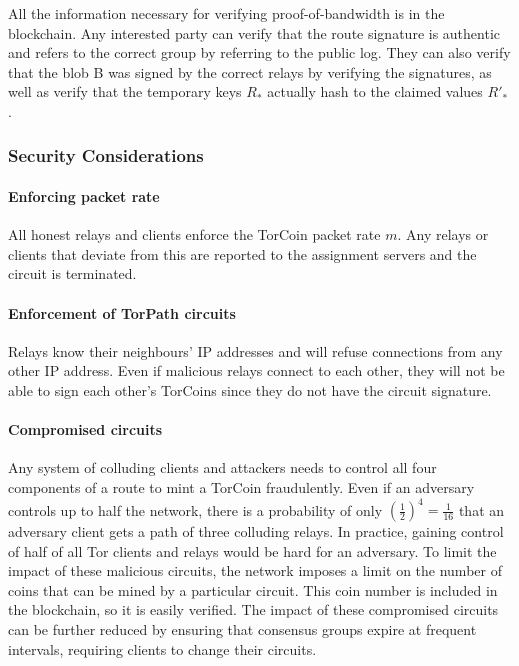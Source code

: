 All the information necessary for verifying proof-of-bandwidth is in the
blockchain. Any interested party can verify that the route signature is
authentic and refers to the correct group by referring to the public log. They
can also verify that the blob B was signed by the correct relays by verifying
the signatures, as well as verify that the temporary keys $R_*$ actually hash to
the claimed values $R'_*$. 

\subsubsection{Security Considerations}

\paragraph{Enforcing packet rate} All honest relays and clients enforce the
TorCoin packet rate $m$. Any relays or clients that deviate from this are
reported to the assignment servers and the circuit is terminated.

\paragraph{Enforcement of TorPath circuits} Relays know their neighbours'
IP addresses and will refuse connections from any other IP address. Even if
malicious relays connect to each other, they will not be able to sign each
other's TorCoins since they do not have the circuit signature.

\paragraph{Compromised circuits} Any system of colluding clients and
attackers needs to control all four components of a route to mint a TorCoin
fraudulently. Even if an adversary controls up to half the network, there is a
probability of only $(\frac{1}{2})^4 = \frac{1}{16}$ that an adversary client
gets a path of three colluding relays. In practice, gaining control of half of
all Tor clients and relays would be hard for an adversary.  To limit the
impact of these malicious circuits, the network imposes a limit on the number
of coins that can be mined by a particular circuit. This coin number is
included in the blockchain, so it is easily verified. 
The impact of these
compromised circuits can be further reduced by ensuring that consensus groups
expire at frequent intervals, requiring clients to change their circuits.

